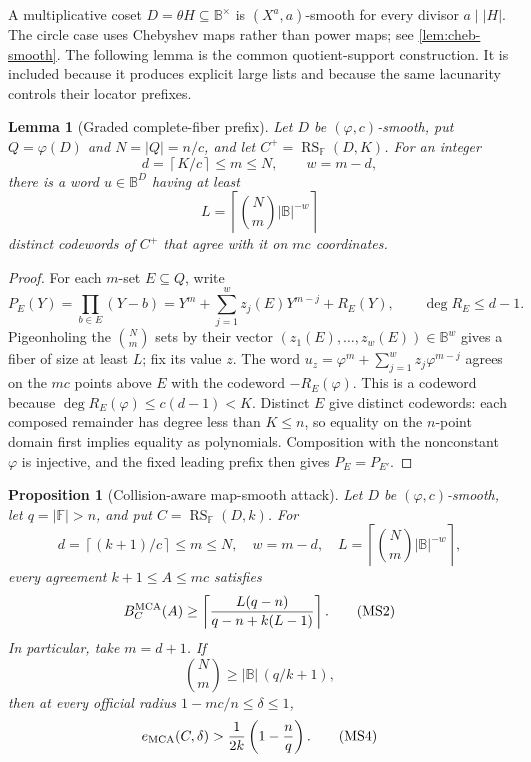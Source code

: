 \documentclass[11pt,a4paper]{amsart}
\numberwithin{equation}{section}
\newtheorem{proposition}[proposition]{Proposition}
\newtheorem{lemma}[lemma]{Lemma}
\theoremstyle{remark}
\DeclareMathOperator{\RS}{RS}
\newcommand{\F}{\mathbb F}
\newcommand{\B}{\mathbb B}
\newcommand{\abs}[1]{\lvert #1\rvert}
\newcommand{\ceil}[1]{\left\lceil #1\right\rceil}
\begin{document}
A multiplicative coset \(D=\theta H\subseteq\B^\times\) is \((X^a,a)\)-smooth for every divisor \(a\mid\abs H\).  The circle case uses Chebyshev maps rather than power maps; see \cref{lem:cheb-smooth}.  The following lemma is the common quotient-support construction.  It is included because it produces explicit large lists and because the same lacunarity controls their locator prefixes.

\begin{lemma}[Graded complete-fiber prefix]
\label{lem:map-smooth-fiber}
Let \(D\) be \((\varphi,c)\)-smooth, put \(Q=\varphi(D)\) and
\(N=\abs Q=n/c\), and let \(C^+=\RS_\F(D,K)\).  For an integer
\[
 d=\ceil{K/c}\le m\le N,\qquad w=m-d,
\]
there is a word \(u\in\B^D\) having at least
\[
                         L=\ceil{\binom Nm\abs\B^{-w}}       \tag{MS1}
 \label{eq:graded-fiber-list}
\]
distinct codewords of \(C^+\) that agree with it on \(mc\) coordinates.
\end{lemma}

\begin{proof}
For each \(m\)-set \(E\subseteq Q\), write
\[
 P_E(Y)=\prod_{b\in E}(Y-b)
 =Y^m+\sum_{j=1}^{w}z_j(E)Y^{m-j}+R_E(Y),
 \qquad \deg R_E\le d-1.
\]
Pigeonholing the \(\binom Nm\) sets by their vector
\((z_1(E),\ldots,z_w(E))\in\B^w\) gives a fiber of size at least \(L\);
fix its value \(z\).  The word
\(u_z=\varphi^m+\sum_{j=1}^wz_j\varphi^{m-j}\) agrees on the \(mc\)
points above \(E\) with the codeword \(-R_E(\varphi)\).  This is a
codeword because
\(\deg R_E(\varphi)\le c(d-1)<K\).  Distinct \(E\) give distinct
codewords: each composed remainder has degree less than \(K\le n\), so
equality on the \(n\)-point domain first implies equality as polynomials.
Composition with the nonconstant \(\varphi\) is injective, and the fixed
leading prefix then gives
\(P_E=P_{E'}\).
\end{proof}

\begin{proposition}[Collision-aware map-smooth attack]
\label{prop:map-smooth-cap}
Let \(D\) be \((\varphi,c)\)-smooth, let \(q=\abs\F>n\), and put
\(C=\RS_\F(D,k)\).  For
\[
 d=\ceil{(k+1)/c}\le m\le N,\quad w=m-d,\quad
 L=\ceil{\binom Nm\abs\B^{-w}},
\]
every agreement \(k+1\le A\le mc\) satisfies
\[
 B_C^{\rm MCA}(A)\ge
 \left\lceil\frac{L(q-n)}{q-n+k(L-1)}\right\rceil.          \tag{MS2}
 \label{eq:map-smooth-attack}
\]
In particular, take \(m=d+1\).  If
\[
                         \binom Nm\ge\abs\B\,(q/k+1),       \tag{MS3}
 \label{eq:map-smooth-cap-condition}
\]
then at every official radius \(1-mc/n\le\delta\le1\),
\[
 e_{\rm MCA}(C,\delta)>
 \frac1{2k}\left(1-\frac nq\right).                         \tag{MS4}
 \label{eq:map-smooth-security-cap}
\]
\end{proposition}
\end{document}
